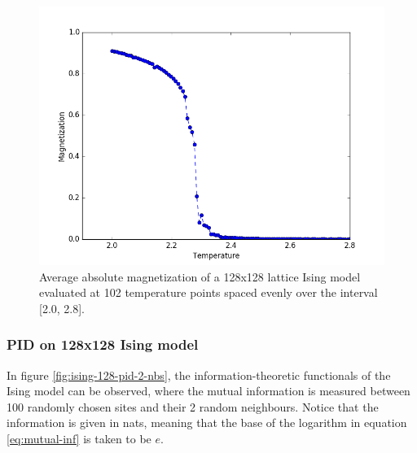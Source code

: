 \documentclass[12pt]{article}
\begin{document}
\begin{figure} [h!]
\begin{center}
\includegraphics[width=\textwidth]{ising-128-mags}
\caption{Average absolute magnetization of a 128x128 lattice Ising model evaluated at 102 temperature points spaced evenly over the interval [2.0, 2.8].}
\label{fig:ising-128-mags}
\end{center}
\end{figure}

\subsubsection{PID on 128x128 Ising model}

In figure \ref{fig:ising-128-pid-2-nbs}, the information-theoretic functionals of the Ising model can be observed, where the mutual information is measured between 100 randomly chosen sites and their 2 random neighbours. Notice that the information is given in nats, meaning that the base of the logarithm in equation \ref{eq:mutual-inf} is taken to be $e$. 
\end{document}
